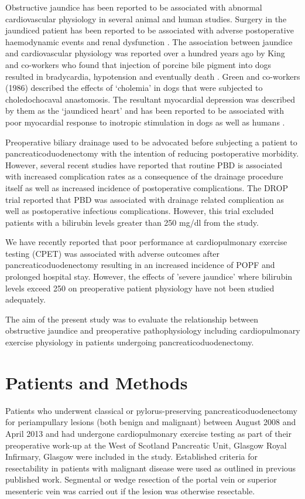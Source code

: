 Obstructive jaundice has been reported to be associated with abnormal cardiovascular physiology in several animal and human studies. Surgery in the jaundiced patient has been reported to be associated with adverse postoperative haemodynamic events and renal dysfunction \parencite{pain_perioperative_1985,green_systemic_1995}. The association between jaundice and cardiovascular physiology was reported over a hundred years ago by King and co-workers who found that injection of porcine bile pigment into dogs resulted in bradycardia, hypotension and eventually death \parencite{king_effect_1909}. Green and co-workers (1986) described the effects of ‘cholemia' in dogs that were subjected to choledochocaval anastomosis. The resultant myocardial depression was described by them as the ‘jaundiced heart'\parencite{green_jaundiced_1986} and has been reported to be associated with poor myocardial response to inotropic stimulation in dogs \parencite{binah_obstructive_1985, bomzon_systemic_1986} as well as humans \parencite{lumlertgul_jaundiced_1991}.

Preoperative biliary drainage used to be advocated before subjecting a patient to pancreaticoduodenectomy with the intention of reducing postoperative morbidity. However, several recent studies have reported that routine PBD is associated with increased complication rates as a consequence of the drainage procedure itself as well as increased incidence of postoperative complications. The DROP trial reported that PBD was associated with drainage related complication as well as postoperative infectious complications. However, this trial excluded patients with a bilirubin levels greater than 250 mg/dl from the study. 

We have recently reported that poor performance at cardiopulmonary exercise testing (CPET) was associated with adverse outcomes after pancreaticoduodenectomy resulting in an increased incidence of POPF and prolonged hospital stay. However, the effects of 'severe jaundice' where bilirubin levels exceed 250 on preoperative patient physiology have not been studied adequately. 

The aim of the present study was to evaluate the relationship between obstructive jaundice and preoperative pathophysiology including cardiopulmonary exercise physiology in patients undergoing pancreaticoduodenectomy.

\clearpage

\section{Patients and Methods}
Patients who underwent classical or pylorus-preserving pancreaticoduodenectomy for periampullary lesions (both benign and malignant) between August 2008 and April 2013 and had undergone cardiopulmonary exercise testing as part of their preoperative work-up at the West of Scotland Pancreatic Unit, Glasgow Royal Infirmary, Glasgow were included in the study. Established criteria for resectability in patients with malignant disease were used as outlined in previous published work. Segmental or wedge resection of the portal vein or superior mesenteric vein was carried out if the lesion was otherwise resectable.


